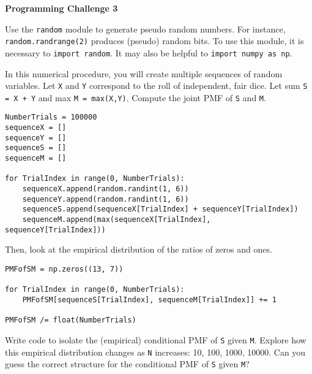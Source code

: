 \documentclass[11pt]{article}
\begin{document}
\begin{center}
{\bfseries \LARGE Programming Challenge 3}
\end{center}

Use the \texttt{random} module to generate pseudo random numbers.
For instance, \texttt{random.randrange(2)} produces (pseudo) random bits.
To use this module, it is necessary to \texttt{import random}.
It may also be helpful to \texttt{import numpy as np}.

In this numerical procedure, you will create multiple sequences of random variables.
Let \texttt{X} and \texttt{Y} correspond to the roll of independent, fair dice.
Let sum \texttt{S = X + Y} and max \texttt{M = max(X,Y)}.
Compute the joint PMF of \texttt{S} and \texttt{M}.
\begin{verbatim}
NumberTrials = 100000
sequenceX = []
sequenceY = []
sequenceS = []
sequenceM = []

for TrialIndex in range(0, NumberTrials):
    sequenceX.append(random.randint(1, 6))
    sequenceY.append(random.randint(1, 6))
    sequenceS.append(sequenceX[TrialIndex] + sequenceY[TrialIndex])
    sequenceM.append(max(sequenceX[TrialIndex], sequenceY[TrialIndex]))
\end{verbatim}
Then, look at the empirical distribution of the ratios of zeros and ones.
\begin{verbatim}
PMFofSM = np.zeros((13, 7))

for TrialIndex in range(0, NumberTrials):
    PMFofSM[sequenceS[TrialIndex], sequenceM[TrialIndex]] += 1

PMFofSM /= float(NumberTrials)
\end{verbatim}
Write code to isolate the (empirical) conditional PMF of \texttt{S} given \texttt{M}.
Explore how this empirical distribution changes as \texttt{N} increases: 10, 100, 1000, 10000.
Can you guess the correct structure for the conditional PMF of \texttt{S} given \texttt{M}?
\end{document}
